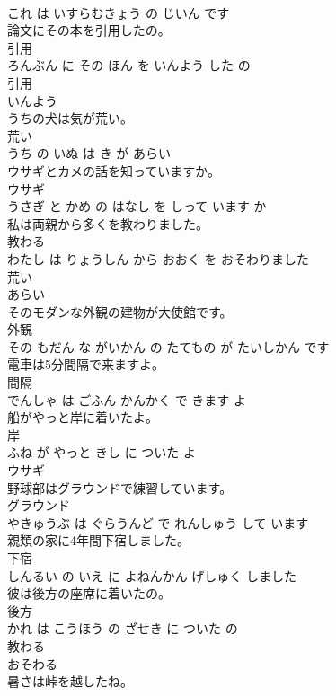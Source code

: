 \documentclass[8pt]{extreport}
\begin{document}
\begin{CJK}{UTF8}{min}
\\	これ は いすらむきょう の じいん です			
\\	論文にその本を引用したの。	
\\	引用 
\\	ろんぶん に その ほん を いんよう した の			
\\	引用	
\\	いんよう			
\\	うちの犬は気が荒い。	
\\	荒い 
\\	うち の いぬ は き が あらい			
\\	ウサギとカメの話を知っていますか。	
\\	ウサギ 
\\	うさぎ と かめ の はなし を しって います か			
\\	私は両親から多くを教わりました。	
\\	教わる 
\\	わたし は りょうしん から おおく を おそわりました			
\\	荒い	
\\	あらい			
\\	そのモダンな外観の建物が大使館です。	
\\	外観 
\\	その もだん な がいかん の たてもの が たいしかん です			
\\	電車は5分間隔で来ますよ。	
\\	間隔 
\\	でんしゃ は ごふん かんかく で きます よ			
\\	船がやっと岸に着いたよ。	
\\	岸 
\\	ふね が やっと きし に ついた よ			
\\	ウサギ	
\\	野球部はグラウンドで練習しています。	
\\	グラウンド 
\\	やきゅうぶ は ぐらうんど で れんしゅう して います			
\\	親類の家に4年間下宿しました。	
\\	下宿 
\\	しんるい の いえ に よねんかん げしゅく しました			
\\	彼は後方の座席に着いたの。	
\\	後方 
\\	かれ は こうほう の ざせき に ついた の			
\\	教わる	
\\	おそわる			
\\	暑さは峠を越したね。	

\end{CJK}
\end{document}
